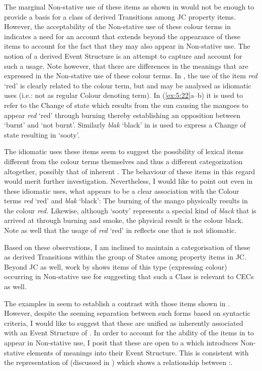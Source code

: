 The marginal Non-stative use of these items as shown in  would not be enough to provide a basis for a class of derived Transitions among JC property items. However, the acceptability of the Non-stative use of these colour terms in  indicates a need for an account that extends beyond the  appearance of these items to account for the fact that they may also appear in Non-stative use. The notion of a derived Event Structure is an attempt to capture and account for such a usage. Note however, that there are differences in the meanings that are expressed in the Non-stative use of these colour terms. In , the use of the item \textit{red} `red’ is clearly related to the colour term, but  and  may be analysed as idiomatic uses (i.e.: not as regular Colour denoting term). In (\ref{ex:5:22}a--b) it is used to refer to the Change of state which results from the sun causing the mangoes to appear \textit{red} `red’ through burning thereby establishing an opposition between `burnt' and `not burnt'. Similarly \textit{blak} `black' in  is used to express a Change of state resulting in `sooty'. 

The idiomatic uses these items seem to suggest the possibility of lexical items different from the colour terms themselves and thus a different categorization altogether, possibly that of inherent . The behaviour of these items in this regard would merit further investigation. Nevertheless, I would like to point out even in these idiomatic uses, what appears to be a clear association with the Colour terms \textit{red} `red' and \textit{blak} `black': The burning of the mango physically results in the colour \textit{red.} Likewise, although `sooty' represents a special kind of \textit{black} that is arrived at through burning and smoke, the physical result is the colour black. Note as well that the usage of \textit{red} `red' in  reflects one that is not idiomatic. 

Based on these observations, I am inclined to maintain a categorisation of these as derived Transitions within the group of States among property items in JC. Beyond JC as well, work by \citet{Alleyne1987} shows items of this type (expressing colour) occurring in Non-stative use for  suggesting that such a Class is relevant to CECs as well. 

The examples in  seem to establish a contrast with those items shown in . However, despite the seeming separation between such forms based on syntactic criteria, I would like to suggest that these are unified as inherently associated with an Event Structure of . In order to account for the ability of the items in  to appear in Non-stative use, I posit that these are open to a  which introduces Non-stative elements of meanings into their Event Structure. This is consistent with the representation of \citet{Carter1976} (discussed in ) which shows a relationship between \DARK:\DARKEN. 

